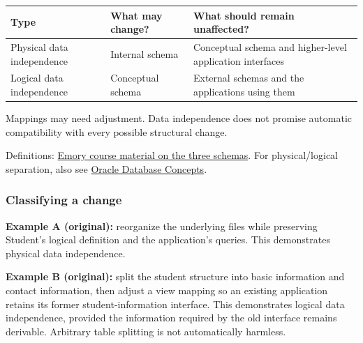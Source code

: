 \begin{longtable}[]{@{}
  >{\raggedright\arraybackslash}p{}
  >{\raggedright\arraybackslash}p{}
  >{\raggedright\arraybackslash}p{}@{}}
\toprule\noalign{}
\begin{minipage}[b]{\linewidth}\raggedright
Type
\end{minipage} & \begin{minipage}[b]{\linewidth}\raggedright
What may change?
\end{minipage} & \begin{minipage}[b]{\linewidth}\raggedright
What should remain unaffected?
\end{minipage} \\
\midrule\noalign{}
\endhead
\bottomrule\noalign{}
\endlastfoot
Physical data independence & Internal schema & Conceptual schema and higher-level application interfaces \\
Logical data independence & Conceptual schema & External schemas and the applications using them \\
\end{longtable}

Mappings may need adjustment. Data independence does not promise automatic compatibility with every possible structural change.

Definitions: \href{https://www.cs.emory.edu/~cheung/Courses/377/Syllabus/1-files/3-schemas.html}{Emory course material on the three schemas}. For physical/logical separation, also see \href{https://docs.oracle.com/en/database/oracle/oracle-database/19/cncpt/introduction-to-oracle-database.html}{Oracle Database Concepts}.

\subsubsection{Classifying a change}\label{01_database_fundamentals_en-classifying-a-change}

\textbf{Example A (original):} reorganize the underlying files while preserving Student's logical definition and the application's queries. This demonstrates physical data independence.

\textbf{Example B (original):} split the student structure into basic information and contact information, then adjust a view mapping so an existing application retains its former student-information interface. This demonstrates logical data independence, provided the information required by the old interface remains derivable. Arbitrary table splitting is not automatically harmless.

